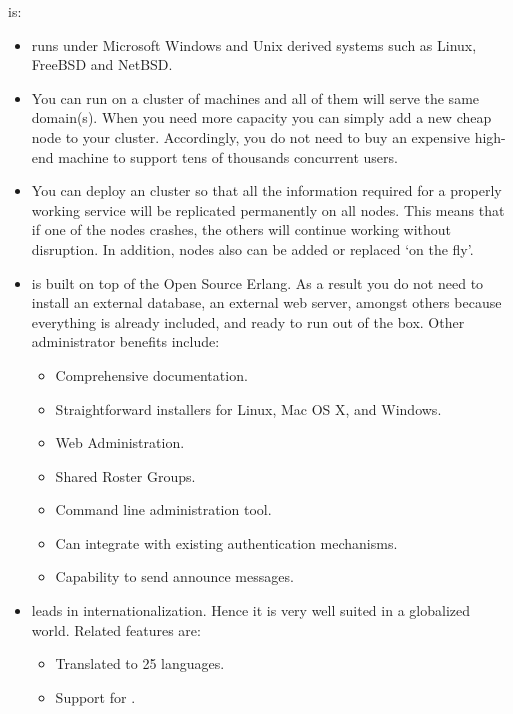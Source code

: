 \ejabberd{} is:
\begin{itemize}
\item {} \ejabberd{} runs under Microsoft Windows and Unix derived systems such as Linux, FreeBSD and NetBSD.

\item {} You can run \ejabberd{} on a cluster of machines and all of them will serve the same \Jabber{} domain(s). When you need more capacity you can simply add a new cheap node to your cluster. Accordingly, you do not need to buy an expensive high-end machine to support tens of thousands concurrent users.

\item {} You can deploy an \ejabberd{} cluster so that all the information required for a properly working service will be replicated permanently on all nodes. This means that if one of the nodes crashes, the others will continue working without disruption. In addition, nodes also can be added or replaced `on the fly'.

\item {} \ejabberd{} is built on top of the Open Source Erlang. As a result you do not need to install an external database, an external web server, amongst others because everything is already included, and ready to run out of the box. Other administrator benefits include:
\begin{itemize}
\item Comprehensive documentation.
\item Straightforward installers for Linux, Mac OS X, and Windows. %
\item Web Administration.
\item Shared Roster Groups.
\item Command line administration tool. %
\item Can integrate with existing authentication mechanisms.
\item Capability to send announce messages.
\end{itemize}

\item {} \ejabberd{} leads in internationalization. Hence it is very well suited in a globalized world. Related features are:
\begin{itemize}
\item Translated to 25 languages. %
\item Support for .
\end{itemize}


\end{itemize}

